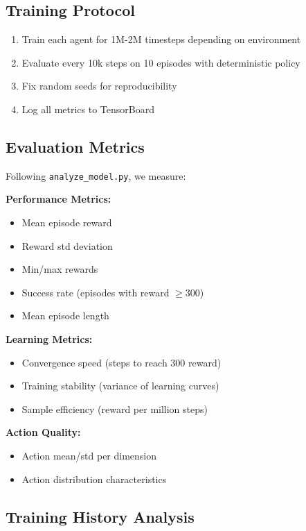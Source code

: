 \documentclass[10pt,a4paper,twocolumn]{article}
\begin{document}
\subsection{Training Protocol}

\begin{enumerate}
    \item Train each agent for 1M-2M timesteps depending on environment
    \item Evaluate every 10k steps on 10 episodes with deterministic policy
    \item Fix random seeds for reproducibility
    \item Log all metrics to TensorBoard
\end{enumerate}

\subsection{Evaluation Metrics}

Following \texttt{analyze\_model.py}, we measure:

\textbf{Performance Metrics:}
\begin{itemize}
    \item Mean episode reward
    \item Reward std deviation
    \item Min/max rewards
    \item Success rate (episodes with reward $\geq 300$)
    \item Mean episode length
\end{itemize}

\textbf{Learning Metrics:}
\begin{itemize}
    \item Convergence speed (steps to reach 300 reward)
    \item Training stability (variance of learning curves)
    \item Sample efficiency (reward per million steps)
\end{itemize}

\textbf{Action Quality:}
\begin{itemize}
    \item Action mean/std per dimension
    \item Action distribution characteristics
\end{itemize}

\subsection{Training History Analysis}
\end{document}
